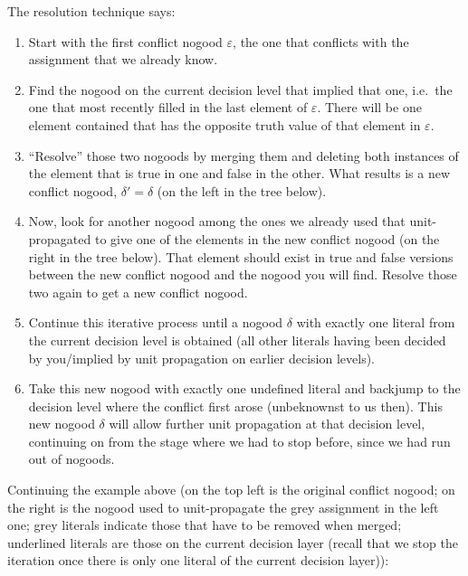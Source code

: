 \documentclass[9pt,a4paper,landscape]{article}
\begin{document}
{The resolution technique says:
\begin{enumerate}[noitemsep]
	\item Start with the first conflict nogood $\varepsilon$, the one that conflicts with the assignment that we already know. 
	\item Find the nogood on the current decision level that implied that one, i.e.\ the one that most recently filled in the last element of $\varepsilon$. 
	There will be one element contained that has the opposite truth value of that element in $\varepsilon$.
	\item ``Resolve'' those two nogoods by merging them and deleting both instances of the element that is true in one and false in the other.
	What results is a new conflict nogood, $\delta' = \delta$ (on the left in the tree below).
	\item Now, look for another nogood among the ones we already used that unit-propagated to give one of the elements in the new conflict nogood (on the right in the tree below).
	That element should exist in true and false versions between the new conflict nogood and the nogood you will find.
	Resolve those two again to get a new conflict nogood.
	\item Continue this iterative process until a nogood $\delta$ with exactly one literal from the current decision level is obtained (all other literals having been decided by you/implied by unit propagation on earlier decision levels).
	\item Take this new nogood with exactly one undefined literal and backjump to the decision level where the conflict first arose (unbeknownst to us then).
	This new nogood $\delta$ will allow further unit propagation at that decision level, continuing on from the stage where we had to stop before, since we had run out of nogoods.
\end{enumerate}

Continuing the example above (on the top left is the original conflict nogood; on the right is the nogood used to unit-propagate the grey assignment in the left one; grey literals indicate those that have to be removed when merged; underlined literals are those on the current decision layer (recall that we stop the iteration once there is only one literal of the current decision layer)):

}
\end{document}

